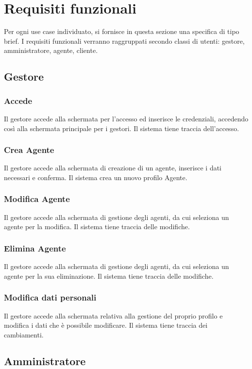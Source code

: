 \section{Requisiti funzionali}
Per ogni use case individuato, si fornisce in questa sezione una
specifica di tipo brief.
I requisiti funzionali verranno raggruppati secondo
classi di utenti: gestore, amministratore, agente, cliente.

\subsection{Gestore}
\subsubsection{Accede}
Il gestore accede alla schermata per l'accesso ed inserisce le credenziali, 
accedendo così alla schermata principale per i gestori. Il sistema tiene 
traccia dell'accesso.

\subsubsection{Crea Agente}
Il gestore accede alla schermata di creazione di un agente, inserisce i 
dati necessari e conferma. Il sistema crea un nuovo profilo Agente.

\subsubsection{Modifica Agente}
Il gestore accede alla schermata di gestione degli agenti, da cui 
seleziona un agente per la modifica. Il sistema tiene traccia delle
modifiche.

\subsubsection{Elimina Agente}
Il gestore accede alla schermata di gestione degli agenti, da cui 
seleziona un agente per la sua eliminazione. Il sistema tiene traccia delle
modifiche.

\subsubsection{Modifica dati personali}
Il gestore accede alla schermata relativa alla gestione del proprio 
profilo e modifica i dati che è possibile modificare. Il sistema 
tiene traccia dei cambiamenti.

\subsection{Amministratore}
